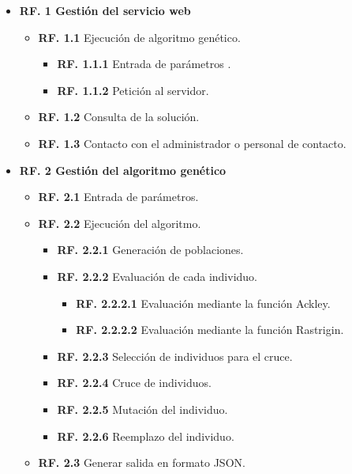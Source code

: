 \begin{itemize}
	\item  \textbf{RF. 1 Gestión del servicio web}
	\begin{itemize}
		\item \textbf{RF. 1.1} Ejecución de algoritmo genético.
		\begin{itemize}
			\item \textbf{RF. 1.1.1} Entrada de parámetros .
			\item \textbf{RF. 1.1.2} Petición al servidor.
		\end{itemize}
		
		\item \textbf{RF. 1.2} Consulta de la solución.
		\item \textbf{RF. 1.3} Contacto con el administrador o personal de contacto.
	\end{itemize}
	
	\item  \textbf{RF. 2 Gestión del algoritmo genético}
	\begin{itemize}
		\item \textbf{RF. 2.1} Entrada de parámetros.
		\item \textbf{RF. 2.2} Ejecución del algoritmo.
		\begin{itemize}
			\item \textbf{RF. 2.2.1} Generación de poblaciones.
			\item \textbf{RF. 2.2.2} Evaluación de cada individuo.
			\begin{itemize}
				\item \textbf{RF. 2.2.2.1} Evaluación mediante la función Ackley.
				\item \textbf{RF. 2.2.2.2} Evaluación mediante la función Rastrigin.
			\end{itemize}
			\item \textbf{RF. 2.2.3} Selección de individuos para el cruce.
			\item \textbf{RF. 2.2.4} Cruce de individuos.
			\item \textbf{RF. 2.2.5} Mutación del individuo.
			\item \textbf{RF. 2.2.6} Reemplazo del individuo.
		\end{itemize}
		\item \textbf{RF. 2.3} Generar salida en formato JSON.
	\end{itemize}
	
\end{itemize}




